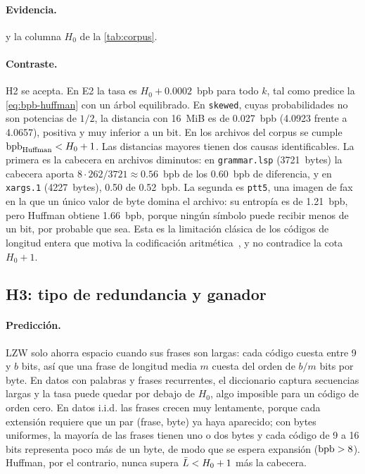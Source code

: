 \paragraph{Evidencia.}  y la columna $H_0$ de la \cref{tab:corpus}.
\paragraph{Contraste.} H2 se acepta. En E2 la tasa es $H_0 + 0.0002$~bpb para todo $k$, tal
como predice la \cref{eq:bpb-huffman} con un árbol equilibrado. En \texttt{skewed}, cuyas
probabilidades no son potencias de $1/2$, la distancia con 16~MiB es de 0.027~bpb (4.0923 frente
a 4.0657), positiva y muy inferior a un bit. En los \resCorpusFiles{} archivos del corpus se
cumple $\mathrm{bpb}_{\text{Huffman}} < H_0 + 1$. Las distancias mayores tienen dos causas
identificables. La primera es la cabecera en archivos diminutos: en \texttt{grammar.lsp}
(3721~bytes) la cabecera aporta $8 \cdot 262 / 3721 \approx 0.56$~bpb de los 0.60~bpb de
diferencia, y en \texttt{xargs.1} (4227~bytes), 0.50 de 0.52~bpb. La segunda es
\texttt{ptt5}, una imagen de fax en la que un único valor de byte domina el archivo: su
entropía es de 1.21~bpb, pero Huffman obtiene 1.66~bpb, porque ningún símbolo puede recibir
menos de un bit, por probable que sea. Esta es la limitación clásica de los códigos de longitud
entera que motiva la codificación aritmética~\cite{witten1987}, y no contradice la cota
$H_0 + 1$.

\subsection{H3: tipo de redundancia y ganador}
\label{sec:disc-h3}
\paragraph{Predicción.} LZW solo ahorra espacio cuando sus frases son largas: cada código
cuesta entre 9 y $b$ bits, así que una frase de longitud media $m$ cuesta del orden de
$b/m$ bits por byte. En datos con palabras y frases recurrentes, el diccionario captura
secuencias largas y la tasa puede quedar por debajo de $H_0$, algo imposible para un código de
orden cero. En datos i.i.d. las frases crecen muy lentamente, porque cada extensión requiere
que un par (frase, byte) ya haya aparecido; con bytes uniformes, la mayoría de las frases
tienen uno o dos bytes y cada código de 9 a 16 bits representa poco más de un byte, de modo
que se espera expansión ($\mathrm{bpb} > 8$). Huffman, por el contrario, nunca supera
$\bar{L} < H_0 + 1$ más la cabecera.

